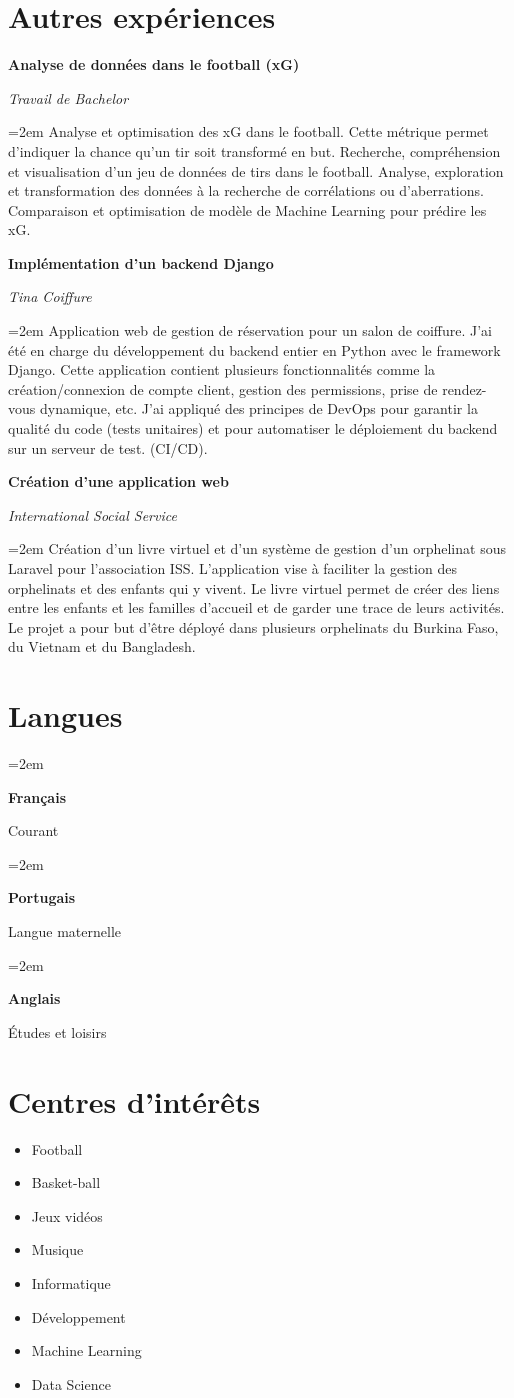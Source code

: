 \documentclass[12pt]{article} %
\newlength{\spacebox}
\newcommand{\sepspace}{\vspace*{1em}}
\newcommand{\otherxp}[4]{
    \noindent  \textbf{#1}
    \hfill
    \framebox{%
        \parbox{10em}{%
            \centering\textbf{#2}}} \par
    \noindent \textit{#3} \par
    \vspace*{0.5em}
    \noindent\hangindent=2em\hangafter=0 \small #4
    \normalsize \par}
\newcommand{\lan}[2]{
    \noindent\hangindent=2em\hangafter=0
    \parbox{\spacebox}{%
        \textbf{#1}} %
    #2 \par}    %
\begin{document}
\section*{Autres expériences}
\otherxp{Analyse de données dans le football (xG)}{2022-2023}{Travail de Bachelor}{Analyse et optimisation des xG dans le football. Cette métrique permet d'indiquer la chance qu'un tir soit transformé en but. Recherche, compréhension et visualisation d'un jeu de données de tirs dans le football. Analyse, exploration et transformation des données à la recherche de corrélations ou d'aberrations. Comparaison et optimisation de modèle de Machine Learning pour prédire les xG.}
\sepspace
\otherxp{Implémentation d'un backend Django}{2022-2023}{Tina Coiffure}{Application web de gestion de réservation pour un salon de coiffure. J'ai été en charge du développement du backend entier en Python avec le framework Django. Cette application contient plusieurs fonctionnalités comme la création/connexion de compte client, gestion des permissions, prise de rendez-vous dynamique, etc. J'ai appliqué des principes de DevOps pour garantir la qualité du code (tests unitaires) et pour automatiser le déploiement du backend sur un serveur de test. (CI/CD).}
\sepspace
\otherxp{Création d'une application web}{2018-2019}{International Social Service}{Création d'un livre virtuel et d'un système de gestion d'un orphelinat sous Laravel pour l'association ISS. L'application vise à faciliter la gestion des orphelinats et des enfants qui y vivent. Le livre virtuel permet de créer des liens entre les enfants et les familles d'accueil et de garder une trace de leurs activités. Le projet a pour but d'être déployé dans plusieurs orphelinats du Burkina Faso, du Vietnam et du Bangladesh.}


\section*{Langues}
\lan{Français}{Courant}
\lan{Portugais}{Langue maternelle}
\lan{Anglais}{Études et loisirs}

\section*{Centres d'intérêts}
\begin{itemize}
    \item Football
    \item Basket-ball
    \item Jeux vidéos
    \item Musique
    \item Informatique
    \item Développement
    \item Machine Learning
    \item Data Science
\end{itemize}
\end{document}
